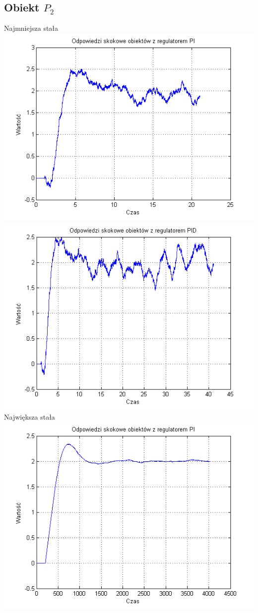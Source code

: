 \documentclass[10pt,a4paper]{article}
\begin{document}
\subsection*{Obiekt $P_2$}
Najmniejsza stała\\
\includegraphics[scale=1]{images/trzy/skrypt_03.png}\\
\includegraphics[scale=1]{images/cztery/skrypt_03.png}\\
Największa stała\\
\includegraphics[scale=1]{images/trzy/skrypt_04.png}\\
\end{document}
